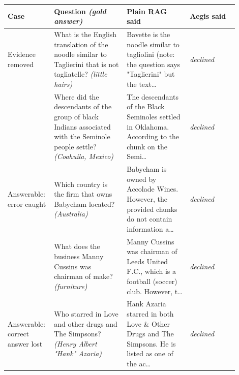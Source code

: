 \begin{tabular}{>{\raggedright\arraybackslash}p{0.14\linewidth}>{\raggedright\arraybackslash}p{0.3\linewidth}>{\raggedright\arraybackslash}p{0.26\linewidth}>{\raggedright\arraybackslash}p{0.2\linewidth}}
\toprule
Case & Question \textit{(gold answer)} & Plain RAG said & Aegis said \\
\midrule
Evidence removed & What is the English translation of the noodle similar to Taglierini that is not tagliatelle? \textit{(little hairs)} & Bavette is the noodle similar to tagliolini (note: the question says "Taglierini" but the text… & \emph{declined} \\
 & Where did the descendants of the group of black Indians associated with the Seminole people settle? \textit{(Coahuila, Mexico)} & The descendants of the Black Seminoles settled in Oklahoma. According to the chunk on the Semi… & \emph{declined} \\
\addlinespace
Answerable: error caught & Which country is the firm that owns Babycham located? \textit{(Australia)} & Babycham is owned by Accolade Wines. However, the provided chunks do not contain information a… & \emph{declined} \\
 & What does the business Manny Cussins was chairman of make? \textit{(furniture)} & Manny Cussins was chairman of Leeds United F.C., which is a football (soccer) club. However, t… & \emph{declined} \\
\addlinespace
Answerable: correct answer lost & Who starred in Love and other drugs and The Simpsons? \textit{(Henry Albert "Hank" Azaria)} & Hank Azaria starred in both Love \& Other Drugs and The Simpsons. He is listed as one of the ac… & \emph{declined} \\
\bottomrule
\end{tabular}
